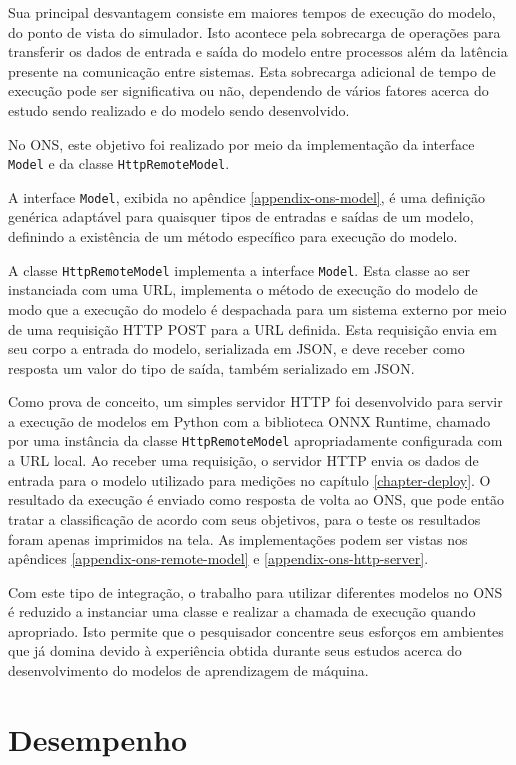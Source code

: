 Sua principal desvantagem consiste em maiores tempos de execução do modelo, do ponto de vista do simulador. Isto acontece pela sobrecarga de operações para transferir os dados de entrada e saída do modelo entre processos além da latência presente na comunicação entre sistemas. Esta sobrecarga adicional de tempo de execução pode ser significativa ou não, dependendo de vários fatores acerca do estudo sendo realizado e do modelo sendo desenvolvido.

No ONS, este objetivo foi realizado por meio da implementação da interface \texttt{Model} e da classe \texttt{HttpRemoteModel}.

A interface \texttt{Model}, exibida no apêndice \ref{appendix-ons-model}, é uma definição genérica adaptável para quaisquer tipos de entradas e saídas de um modelo, definindo a existência de um método específico para execução do modelo.

A classe \texttt{HttpRemoteModel} implementa a interface \texttt{Model}. Esta classe ao ser instanciada com uma URL, implementa o método de execução do modelo de modo que a execução do modelo é despachada para um sistema externo por meio de uma requisição HTTP POST para a URL definida. Esta requisição envia em seu corpo a entrada do modelo, serializada em JSON, e deve receber como resposta um valor do tipo de saída, também serializado em JSON.

Como prova de conceito, um simples servidor HTTP foi desenvolvido para servir a execução de modelos em Python com a biblioteca ONNX Runtime, chamado por uma instância da classe \texttt{HttpRemoteModel} apropriadamente configurada com a URL local. Ao receber uma requisição, o servidor HTTP envia os dados de entrada para o modelo utilizado para medições no capítulo \ref{chapter-deploy}. O resultado da execução é enviado como resposta de volta ao ONS, que pode então tratar a classificação de acordo com seus objetivos, para o teste os resultados foram apenas imprimidos na tela. As implementações podem ser vistas nos apêndices \ref{appendix-ons-remote-model} e \ref{appendix-ons-http-server}.

Com este tipo de integração, o trabalho para utilizar diferentes modelos no ONS é reduzido a instanciar uma classe e realizar a chamada de execução quando apropriado. Isto permite que o pesquisador concentre seus esforços em ambientes que já domina devido à experiência obtida durante seus estudos acerca do desenvolvimento do modelos de aprendizagem de máquina.

\section{Desempenho}

